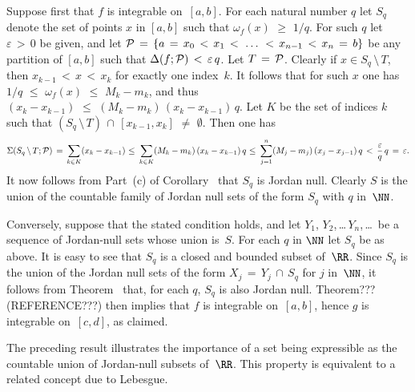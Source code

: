         Suppose first that $f$ is integrable on~$[a,b]$. For each natural number $q$ let $S_{q}$ denote the set of points $x$ in $[a,b]$ such that ${\omega}_{f}(x)\,\,{\geq}\,\,1/q$.
    For such $q$ let ${\varepsilon}\,>\,0$ be given, and let ${\cal P} \,=\, \{a \,=\, x_{0}\,<\,x_{1}\,<\,\,{\ldots}\,\,<\,x_{n-1}\,<\,x_{n} \,=\, b\}$
    be any partition of $[a,b]$ such that ${\Delta}(f;{\cal P})\,<\,{\varepsilon}\,q$. Let $T \,=\, {\cal P}$.
    Clearly if $x{\in}S_{q}\,{\setminus}\,T$, then $x_{k-1}\,<\,x\,<\,x_{k}$ for exactly one index~$k$.
    It follows that for such $x$ one has $1/q\,\,{\leq}\,\,{\omega}_{f}(x)\,\,{\leq}\,\,M_{k}-m_{k}$, and thus $(x_{k}-x_{k-1})\,\,{\leq}\,\,(M_{k}-m_{k})\,(x_{k}-x_{k-1})\,q$.
    Let $K$ be the set of indices $k$ such that $(S_{q}\,{\setminus}\,T)\,{\cap}\,[x_{k-1},x_{k}] \,\,{\neq}\,\, {\emptyset}$. Then one has
        \begin{displaymath}
        {\Sigma}(S_{q}\,{\setminus}\,T;{\cal P})
     \,=\, 
        \sum_{k{\in}K} (x_{k}-x_{k-1})
    \,\,{\leq}\,\,
        \sum_{k{\in}K} (M_{k} - m_{k})\,(x_{k}-x_{k-1})\,q
    \,\,{\leq}\,\,
        \sum_{j=1}^{n} (M_{j} - m_{j})\,(x_{j}-x_{j-1})\,q
    \,<\,
        \frac{{\varepsilon}}{q}\,q \,=\, {\varepsilon}.
        \end{displaymath}
    It now follows from Part~(c) of Corollary~ that $S_{q}$ is Jordan null. Clearly $S$ is the union of the countable family of Jordan null sets of the form $S_{q}$ with $q$ in~${\NN}$.

        Conversely, suppose that the stated condition holds, and let $Y_{1}$, $Y_{2}$,\,{\ldots}\,$Y_{n}$,\,{\ldots}\, be a sequence of Jordan-null sets whose union is~$S$.
    For each $q$ in ${\NN}$ let $S_{q}$ be as above. It is easy to see that $S_{q}$ is a closed and bounded subset of~${\RR}$. %
    Since $S_{q}$ is the union of the Jordan null sets of the form $X_{j} \,=\, Y_{j}\,{\cap}\,S_{q}$ for $j$ in~${\NN}$,
    it follows from Theorem~ that, for each $q$, $S_{q}$ is also Jordan null. Theorem??? (REFERENCE???)
    then implies that $f$ is integrable on~$[a,b]$, hence $g$ is integrable on~$[c,d]$, as claimed. \Q

\VV

        The preceding result illustrates the importance of a set being expressible as the countable union of Jordan-null subsets of~${\RR}$.
    This property is equivalent to a related concept due to Lebesgue.

\V

